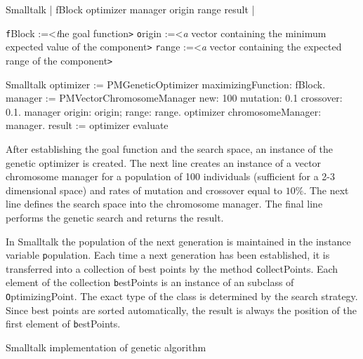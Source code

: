 \begin{displaycode}{Smalltalk}
    | fBlock optimizer manager origin range result |
\end{displaycode}
 {\texttt fBlock :=<\textsl the goal function\texttt >}\hfil\break
 {\texttt origin :=<\textsl a vector containing the minimum expected value of the component\texttt >}\hfil\break
 {\texttt range :=<\textsl a vector containing the expected range of the component\texttt >}\hfil\break
\begin{displaycode}{Smalltalk}
    optimizer := PMGeneticOptimizer maximizingFunction: fBlock.
    manager := PMVectorChromosomeManager new: 100 mutation: 0.1 crossover: 0.1.
    manager origin: origin; range: range.
    optimizer chromosomeManager: manager.
    result := optimizer evaluate
\end{displaycode}
After establishing the goal function and the search space, an
instance of the genetic optimizer is created. The next line
creates an instance of a vector chromosome manager for a
population of 100 individuals (sufficient for a 2-3 dimensional
space) and rates of mutation and crossover equal to $10\%$. The
next line defines the search space into the chromosome manager.
The final line performs the genetic search and returns the result.

In Smalltalk the population of the next generation is maintained
in the instance variable {\texttt population}. Each time a next
generation has been established, it is transferred into a
collection of best points by the method {\texttt collectPoints}. Each
element of the collection {\texttt bestPoints} is an instance of an
subclass of {\texttt OptimizingPoint}. The exact type of the class is
determined by the search strategy. Since best points are sorted
automatically, the result is always the position of the first
element of  {\texttt bestPoints}.

\begin{listing} Smalltalk implementation of genetic algorithm \label{ls:optimizerabsgen}

\end{listing}


